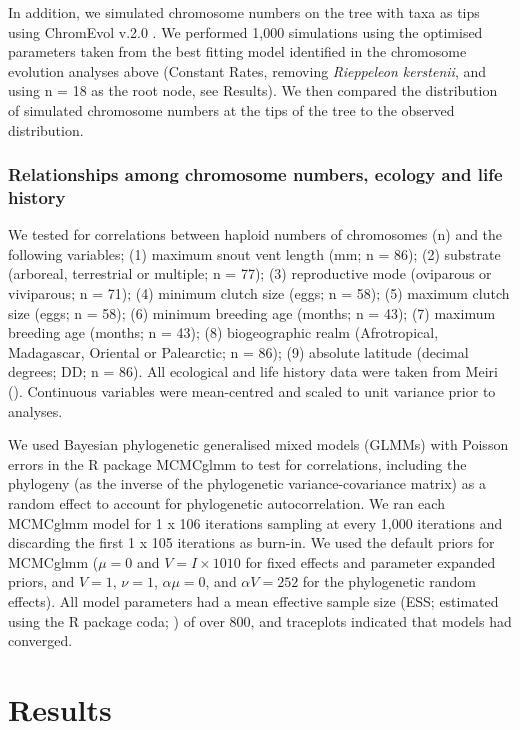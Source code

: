 \documentclass[a4paper, 12pt]{article}
\begin{document}
In addition, we simulated chromosome numbers on the tree with taxa as tips using ChromEvol v.2.0 \citep{glick2014chromevol,mayrose2010probabilistic}. 
We performed 1,000 simulations using the optimised parameters taken from the best fitting model identified in the chromosome evolution analyses above (Constant Rates, removing \textit{Rieppeleon kerstenii}, and using n = 18 as the root node, see Results). 
We then compared the distribution of simulated chromosome numbers at the tips of the tree to the observed distribution. 

\subsubsection{Relationships among chromosome numbers, ecology and life history}
We tested for correlations between haploid numbers of chromosomes (n) and the following variables; (1) maximum snout vent length (mm; n = 86); (2) substrate (arboreal, terrestrial or multiple; n = 77); (3) reproductive mode (oviparous or viviparous; n = 71); (4) minimum clutch size (eggs; n = 58); (5) maximum clutch size (eggs; n = 58); (6) minimum breeding age (months; n = 43); (7) maximum breeding age (months; n = 43); (8) biogeographic realm (Afrotropical, Madagascar, Oriental or Palearctic; n = 86); (9) absolute latitude (decimal degrees; DD; n = 86). 
All ecological and life history data were taken from Meiri (\citeyear{meiri2018traits}). 
Continuous variables were mean-centred and scaled to unit variance prior to analyses.

We used Bayesian phylogenetic generalised mixed models (GLMMs) with Poisson errors in the R package MCMCglmm \citep{hadfield2010mcmc} to test for correlations, including the phylogeny (as the inverse of the phylogenetic variance-covariance matrix) as a random effect to account for phylogenetic autocorrelation. 
We ran each MCMCglmm model for 1 x 106 iterations sampling at every 1,000 iterations and discarding the first 1 x 105 iterations as burn-in. 
We used the default priors for MCMCglmm ($μ = 0$ and $V = I × 1010$ for fixed effects and parameter expanded priors, and $V = 1$, $\nu = 1$, $\alpha \mu = 0$, and $\alpha V = 252$ for the phylogenetic random effects). 
All model parameters had a mean effective sample size (ESS; estimated using the R package coda; \citealt{plummer2006coda}) of over 800, and traceplots indicated that models had converged.

\section{Results}
\end{document}
